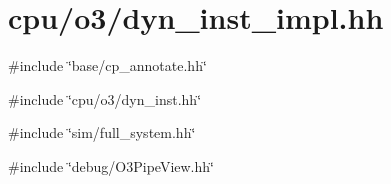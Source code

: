 \hypertarget{o3_2dyn__inst__impl_8hh}{
\section{cpu/o3/dyn\_\-inst\_\-impl.hh}
\label{o3_2dyn__inst__impl_8hh}
}
{\ttfamily \#include \char`\"{}base/cp\_\-annotate.hh\char`\"{}}\par
{\ttfamily \#include \char`\"{}cpu/o3/dyn\_\-inst.hh\char`\"{}}\par
{\ttfamily \#include \char`\"{}sim/full\_\-system.hh\char`\"{}}\par
{\ttfamily \#include \char`\"{}debug/O3PipeView.hh\char`\"{}}\par
